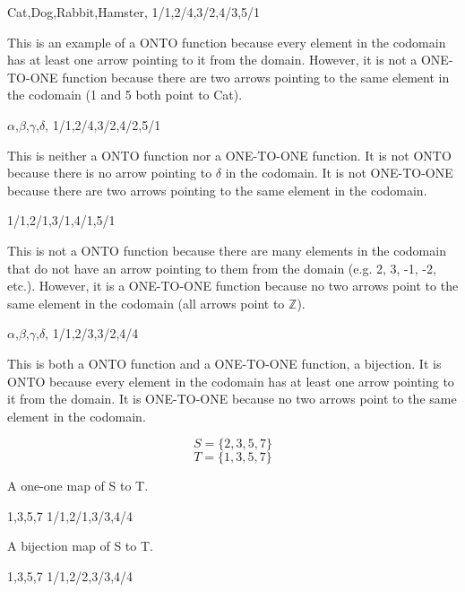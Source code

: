 \documentclass{tufte-handout}
\begin{document}

\begin{question}

    \qpart
    \qsubpart

{Cat,Dog,Rabbit,Hamster,}
{1/1,2/4,3/2,4/3,5/1}

This is an example of a ONTO function because every element in the codomain has at least 
one arrow pointing to it from the domain. However, it is not a ONE-TO-ONE function because 
there are two arrows pointing to the same element in the codomain (1 and 5 both point to Cat).

\qsubpart

{\(\alpha\),\(\beta\),\(\gamma\),\(\delta\),}
{1/1,2/4,3/2,4/2,5/1}

This is neither a ONTO function nor a ONE-TO-ONE function. It is not ONTO because there is no
arrow pointing to \(\delta\) in the codomain. It is not ONE-TO-ONE because there are two arrows
pointing to the same element in the codomain.
    
\qsubpart

{}
{1/1,2/1,3/1,4/1,5/1}

This is not a ONTO function because there are many elements in the codomain that do not have
an arrow pointing to them from the domain (e.g. 2, 3, -1, -2, etc.). However, it is a ONE-TO-ONE function
because no two arrows point to the same element in the codomain (all arrows point to \(\mathbb{Z}\)).

    \qsubpart

{\(\alpha\),\(\beta\),\(\gamma\),\(\delta\),}
{1/1,2/3,3/2,4/4}

This is both a ONTO function and a ONE-TO-ONE function, a bijection. It is ONTO because every element in the
codomain has at least one arrow pointing to it from the domain. It is ONE-TO-ONE because no two arrows
point to the same element in the codomain.

\qpart

\[ S = \{2,3,5,7\} \]
\[ T = \{1,3,5,7\} \]

\qsubpart

A one-one map of S to T.

{1,3,5,7}
{1/1,2/1,3/3,4/4}

\qsubpart

A bijection map of S to T.

{1,3,5,7}
{1/1,2/2,3/3,4/4}

\end{question}
\end{document}
